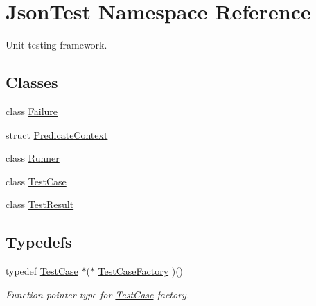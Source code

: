 \hypertarget{namespace_json_test}{\section{Json\+Test Namespace Reference}
\label{namespace_json_test}
}


Unit testing framework.  


\subsection*{Classes}
\begin{DoxyCompactItemize}
\item 
class \hyperlink{class_json_test_1_1_failure}{Failure}
\item 
struct \hyperlink{struct_json_test_1_1_predicate_context}{Predicate\+Context}
\item 
class \hyperlink{class_json_test_1_1_runner}{Runner}
\item 
class \hyperlink{class_json_test_1_1_test_case}{Test\+Case}
\item 
class \hyperlink{class_json_test_1_1_test_result}{Test\+Result}
\end{DoxyCompactItemize}
\subsection*{Typedefs}
\begin{DoxyCompactItemize}
\item 
\hypertarget{namespace_json_test_a7ed671d588f9809e32a8fffb031853c5}{typedef \hyperlink{class_json_test_1_1_test_case}{Test\+Case} $\ast$($\ast$ \hyperlink{namespace_json_test_a7ed671d588f9809e32a8fffb031853c5}{Test\+Case\+Factory} )()}\label{namespace_json_test_a7ed671d588f9809e32a8fffb031853c5}

\begin{DoxyCompactList}\small\item\em Function pointer type for \hyperlink{class_json_test_1_1_test_case}{Test\+Case} factory. \end{DoxyCompactList}\end{DoxyCompactItemize}
